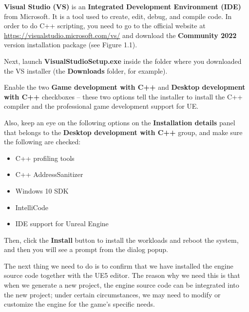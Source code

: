 \documentclass[11pt]{article} %
\begin{document}
\textbf{Visual Studio (VS)} is an \textbf{Integrated Development Environment (IDE)} from Microsoft. It is a tool used to create, edit, debug, and compile code. In order to do C++ scripting, you need to go to the official website at \url{https://visualstudio.microsoft.com/vs/} and download the \textbf{Community 2022} version installation package (see Figure 1.1).

\begin{center}
\end{center}

Next, launch \textbf{VisualStudioSetup.exe} inside the folder where you downloaded the VS installer (the \textbf{Downloads} folder, for example).

Enable the two \textbf{Game development with C++} and \textbf{Desktop development with C++} checkboxes – these two options tell the installer to install the C++ compiler and the professional game development support for UE.

Also, keep an eye on the following options on the \textbf{Installation details} panel that belongs to the \textbf{Desktop development with C++} group, and make sure the following are checked:

\begin{itemize}
\item C++ profiling tools
\item C++ AddressSanitizer
\item Windows 10 SDK
\item IntelliCode
\item IDE support for Unreal Engine
\end{itemize}

Then, click the \textbf{Install} button to install the workloads and reboot the system, and then you will see a prompt from the dialog popup.

The next thing we need to do is to confirm that we have installed the engine source code together with the UE5 editor. The reason why we need this is that when we generate a new project, the engine source code can be integrated into the new project; under certain circumstances, we may need to modify or customize the engine for the game’s specific needs.
\end{document}
